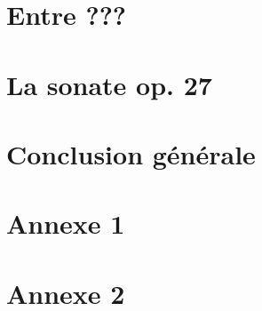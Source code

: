 \documentclass[]{music}
\begin{document}




\newpage
\strut\thispagestyle{empty}
\newpage



\newpage
\strut\thispagestyle{empty}
\newpage

\newpage
\strut\thispagestyle{empty}
\newpage
\tableofcontents
\newpage
\strut\thispagestyle{empty}
\newpage


\part{Entre ???}




\part{La sonate op. 27}




\part{Conclusion générale}




\part*{Annexe 1}


\part*{Annexe 2}




\newpage
\strut\thispagestyle{empty}
\newpage





\end{document}
